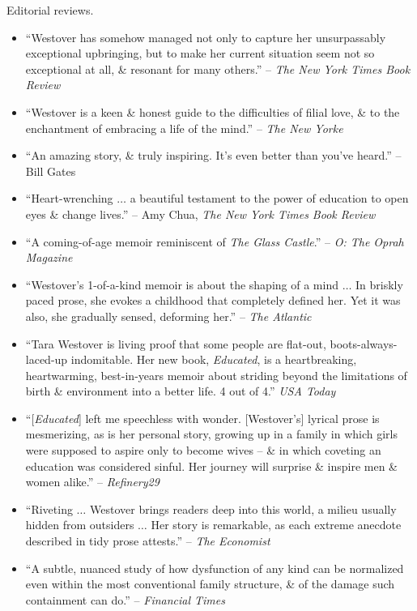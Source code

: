 \documentclass{article}
\begin{document}
\begin{enumerate}
	{\sf Editorial reviews.}
	\begin{itemize}
		\item ``{\sc Westover} has somehow managed not only to capture her unsurpassably exceptional upbringing, but to make her current situation seem not so exceptional at all, \& resonant for many others.'' -- {\it The New York Times Book Review}
		\item ``{\sc Westover} is a keen \& honest guide to the difficulties of filial love, \& to the enchantment of embracing a life of the mind.'' -- {\it The New Yorke}
		\item ``An amazing story, \& truly inspiring. It's even better than you've heard.'' -- {\sc Bill Gates}
		\item ``Heart-wrenching $\ldots$ a beautiful testament to the power of education to open eyes \& change lives.'' -- {\sc Amy Chua}, {\it The New York Times Book Review}
		\item ``A coming-of-age memoir reminiscent of {\it The Glass Castle}.'' -- {\it O: The Oprah Magazine}
		\item ``{\sc Westover}'s 1-of-a-kind memoir is about the shaping of a mind $\ldots$ In briskly paced prose, she evokes a childhood that completely defined her. Yet it was also, she gradually sensed, deforming her.'' -- {\it The Atlantic}
		\item ``{\sc Tara Westover} is living proof that some people are flat-out, boots-always-laced-up indomitable. Her new book, {\it Educated}, is a heartbreaking, heartwarming, best-in-years memoir about striding beyond the limitations of birth \& environment into a better life. 4 out of 4.'' {\it USA Today}
		\item ``[{\it Educated}] left me speechless with wonder. [{\sc Westover}'s] lyrical prose is mesmerizing, as is her personal story, growing up in a family in which girls were supposed to aspire only to become wives -- \& in which coveting an education was considered sinful. Her journey will surprise \& inspire men \& women alike.'' -- {\it Refinery29}
		\item ``Riveting $\ldots$ {\sc Westover} brings readers deep into this world, a milieu usually hidden from outsiders $\ldots$ Her story is remarkable, as each extreme anecdote described in tidy prose attests.'' -- {\it The Economist}
		\item ``A subtle, nuanced study of how dysfunction of any kind can be normalized even within the most conventional family structure, \& of the damage such containment can do.'' -- {\it Financial Times}

\end{itemize}
\end{enumerate}
\end{document}
